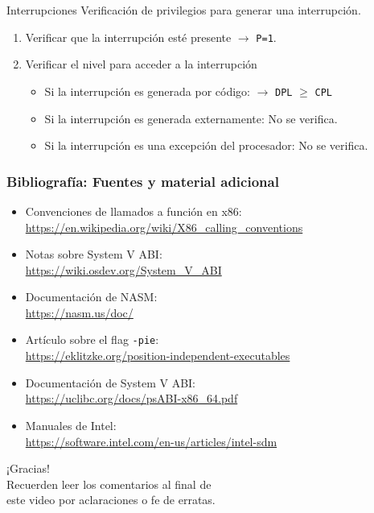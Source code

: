 \documentclass[aspectratio=169]{beamer}
\begin{document}
\begin{frame}{Interrupciones}
    Verificación de privilegios para generar una interrupción.
    \vspace{0.5cm}
    \begin{enumerate}
    \setlength\itemsep{0.4cm}
    \item<2->[1.] Verificar que la interrupción esté presente $\rightarrow$ \texttt{P=1}.
    \item<3->[2.] Verificar el nivel para acceder a la interrupción
    \begin{itemize}
     \item<4->[-] Si la interrupción es generada por código: $\rightarrow$ \texttt{DPL} $\geq$ \texttt{CPL}
     \item<5->[-] Si la interrupción es generada externamente: No se verifica.
     \item<6->[-] Si la interrupción es una excepción del procesador: No se verifica.
    \end{itemize}
    \end{enumerate}
    \vspace{0.5cm}
\end{frame}

\begin{frame}[fragile]
    \frametitle{Bibliografía: Fuentes y material adicional}
    \begin{itemize}
    \item Convenciones de llamados a función en x86: \\
    \url{https://en.wikipedia.org/wiki/X86_calling_conventions}
    \item Notas sobre System V ABI: \\
    \url{https://wiki.osdev.org/System_V_ABI}
    \item Documentación de NASM: \\
    \url{https://nasm.us/doc/}
    \item Artículo sobre el flag \texttt{-pie}: \\
    \url{https://eklitzke.org/position-independent-executables}
    \item Documentación de System V ABI: \\
    \url{https://uclibc.org/docs/psABI-x86_64.pdf}
    \item Manuales de Intel: \\
    \url{https://software.intel.com/en-us/articles/intel-sdm}
    \end{itemize}
\end{frame}

\begin{frame}[plain]
    \begin{center}
    \vspace{2cm}
    \huge ¡Gracias!\\
    \vspace{2cm}
    \normalsize Recuerden leer los comentarios al final de \\ este video por aclaraciones o fe de erratas.
    \end{center}
\end{frame}
\end{document}
